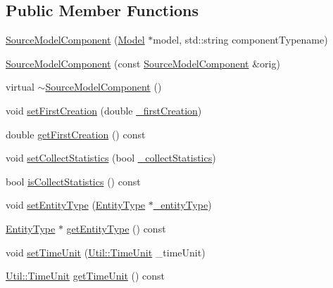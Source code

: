 \subsection*{Public Member Functions}
\begin{DoxyCompactItemize}
\item 
\hyperlink{class_source_model_component_ab8bb5ccbed0901f9d9a810bb5deac5d8}{Source\+Model\+Component} (\hyperlink{class_model}{Model} $\ast$model, std\+::string component\+Typename)
\item 
\hyperlink{class_source_model_component_a8b959636a75fb95d6c8ae21cbf601639}{Source\+Model\+Component} (const \hyperlink{class_source_model_component}{Source\+Model\+Component} \&orig)
\item 
virtual \hyperlink{class_source_model_component_ab8a4b0d8035f1fe9da093fdde16c421c}{$\sim$\+Source\+Model\+Component} ()
\item 
void \hyperlink{class_source_model_component_a4951c6a3662437ed87155293f6b35122}{set\+First\+Creation} (double \hyperlink{class_source_model_component_ad58dddde2b6a81d85f261fa8a11243b3}{\+\_\+first\+Creation})
\item 
double \hyperlink{class_source_model_component_ab7688b78b8e069ebe245446dce9224f7}{get\+First\+Creation} () const 
\item 
void \hyperlink{class_source_model_component_a5558d791e079e06678639995f548479f}{set\+Collect\+Statistics} (bool \hyperlink{class_source_model_component_ac0c009ff9a2e8169d251118dabcd19eb}{\+\_\+collect\+Statistics})
\item 
bool \hyperlink{class_source_model_component_aa7964063eb075c229570e2e3dcc013cf}{is\+Collect\+Statistics} () const 
\item 
void \hyperlink{class_source_model_component_a4405f201c7169761862547486c50f338}{set\+Entity\+Type} (\hyperlink{class_entity_type}{Entity\+Type} $\ast$\hyperlink{class_source_model_component_a564b2c74f5273f8f092d92a5800456cf}{\+\_\+entity\+Type})
\item 
\hyperlink{class_entity_type}{Entity\+Type} $\ast$ \hyperlink{class_source_model_component_aa6b0b8ae8c3ed7c56ba3038cd0bab439}{get\+Entity\+Type} () const 
\item 
void \hyperlink{class_source_model_component_a970939206ab664141633f75e42abfc8e}{set\+Time\+Unit} (\hyperlink{class_util_a28504cc2fecc9aa47154cba4e625ec6f}{Util\+::\+Time\+Unit} \+\_\+time\+Unit)
\item 
\hyperlink{class_util_a28504cc2fecc9aa47154cba4e625ec6f}{Util\+::\+Time\+Unit} \hyperlink{class_source_model_component_a16ef9a226d3f57ad1c0c098cf0dfc8f7}{get\+Time\+Unit} () const 

\end{DoxyCompactItemize}
